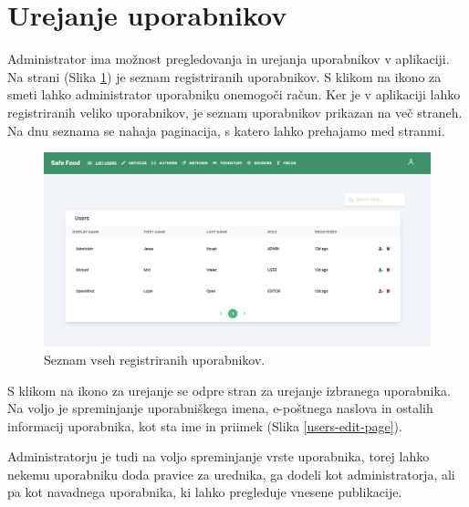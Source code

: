 \documentclass[a4paper, 12pt]{book}
\begin{document}
\section{Urejanje uporabnikov}
\label{administracija-uporabnikov}
Administrator ima možnost pregledovanja in urejanja uporabnikov v aplikaciji. Na strani  (Slika \ref{users-list-page}) je seznam registriranih uporabnikov. S klikom na ikono za smeti lahko administrator uporabniku onemogoči račun. Ker je v aplikaciji lahko registriranih veliko uporabnikov, je seznam uporabnikov prikazan na več straneh. Na dnu seznama se nahaja paginacija, s katero lahko prehajamo med stranmi.

\begin{figure}[h]
\begin{center}
\includegraphics[width=1\textwidth]{slike/users-list.png}
\end{center}
\caption{ Seznam vseh registriranih uporabnikov. }
\label{users-list-page}
\end{figure}

S klikom na ikono za urejanje se odpre stran za urejanje izbranega uporabnika. Na voljo je spreminjanje uporabniškega imena, e-poštnega naslova in ostalih informacij uporabnika, kot sta ime in priimek (Slika \ref{users-edit-page}). 

Administratorju je tudi na voljo spreminjanje vrste uporabnika, torej lahko nekemu uporabniku doda pravice za urednika, ga dodeli kot administratorja, ali pa kot navadnega uporabnika, ki lahko pregleduje vnesene publikacije.
\end{document}
